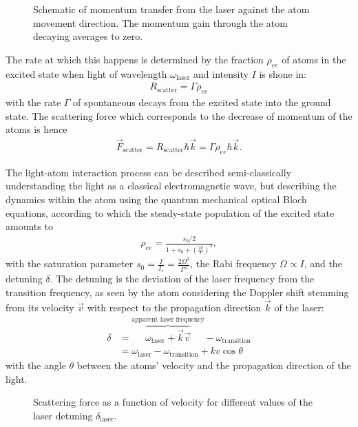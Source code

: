 \begin{figure}    
    \centering
    \caption{Schematic of momentum transfer from the laser against the atom movement direction. The momentum gain through the atom decaying averages to zero.}\label{fig:light_scattering_moment_transfer}
\end{figure}

The rate at which this happens is determined by the fraction $\rho_{ee}$ of atoms in the excited state when light of wavelength $\omega_\text{laser}$ and intensity $I$ is shone in:
\begin{align}
    R_\text{scatter} = \Gamma \rho_{ee}
\end{align}
with the rate $\Gamma$ of spontaneous decays from the excited state into the ground state. The scattering force which corresponds to the decrease of momentum of the atoms is hence
\begin{align}
    \vec F_\text{scatter} = R_\text{scatter} \hbar \vec k = \Gamma \rho_{ee} \hbar \vec k.
\end{align}

The light-atom interaction process can be described semi-classically understanding the light as a classical electromagnetic wave, but describing the dynamics within the atom using the quantum mechanical optical Bloch equations, according to which the steady-state population of the excited state amounts to
\begin{align}
    \rho_{ee} = \frac{s_0/2}{1 + s_0 + {\left(\frac{2\delta}{\Gamma}\right)}^2},
\end{align}
with the saturation parameter $s_0 = \frac{I}{I_s} = \frac{2\Omega^2}{\Gamma^2}$, the Rabi frequency $\Omega \propto I$, and the detuning $\delta$. The detuning is the deviation of the laser frequency from the transition frequency, as seen by the atom considering the Doppler shift stemming from its velocity $\vec v$ with respect to the propagation direction $\vec k$ of the laser:
\begin{align}
    \delta &= \overbrace{\omega_\text{laser} + \vec k \vec v }^\text{apparent laser frequency}- \omega_\text{transition} \\
    \nonumber & = \omega_\text{laser}  - \omega_\text{transition} + kv \cos \theta
\end{align}
with the angle $\theta$ between the atoms' velocity and the propagation direction of the light.

\begin{figure}
    \centering
    \caption{Scattering force as a function of velocity for different values of the laser detuning $\delta_\text{laser}$.}\label{fig:scattering_force_vs_velocity}
\end{figure}

